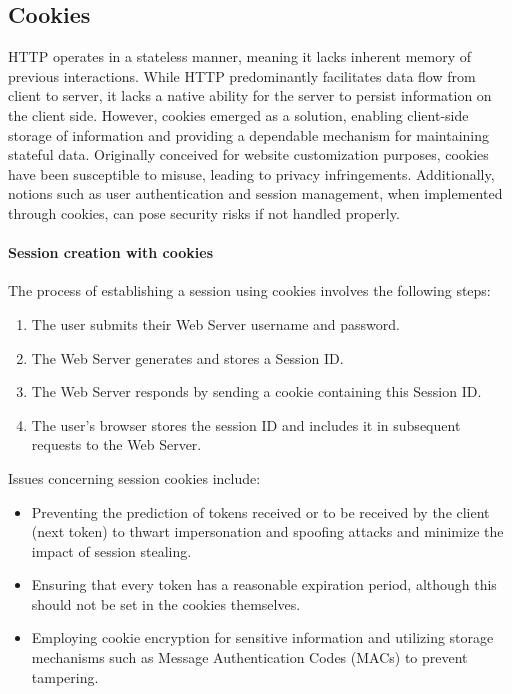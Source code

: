 \subsection{Cookies}
HTTP operates in a stateless manner, meaning it lacks inherent memory of previous interactions. 
While HTTP predominantly facilitates data flow from client to server, it lacks a native ability for the server to persist information on the client side. 
However, cookies emerged as a solution, enabling client-side storage of information and providing a dependable mechanism for maintaining stateful data.
Originally conceived for website customization purposes, cookies have been susceptible to misuse, leading to privacy infringements. 
Additionally, notions such as user authentication and session management, when implemented through cookies, can pose security risks if not handled properly.

\paragraph*{Session creation with cookies}
The process of establishing a session using cookies involves the following steps:
\begin{enumerate}
\item The user submits their Web Server username and password.
\item The Web Server generates and stores a Session ID.
\item The Web Server responds by sending a cookie containing this Session ID.
\item The user's browser stores the session ID and includes it in subsequent requests to the Web Server.
\end{enumerate}
Issues concerning session cookies include:
\begin{itemize}
    \item Preventing the prediction of tokens received or to be received by the client (next token) to thwart impersonation and spoofing attacks and minimize the impact of session stealing.
    \item Ensuring that every token has a reasonable expiration period, although this should not be set in the cookies themselves.
    \item Employing cookie encryption for sensitive information and utilizing storage mechanisms such as Message Authentication Codes (MACs) to prevent tampering.
\end{itemize}